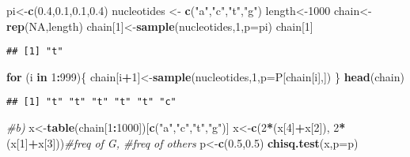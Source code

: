 \documentclass[
]{article}
\newenvironment{Shaded}{\begin{snugshade}}{\end{snugshade}}
\newcommand{\CommentTok}[1]{\textcolor[rgb]{0.56,0.35,0.01}{\textit{#1}}}
\newcommand{\ControlFlowTok}[1]{\textcolor[rgb]{0.13,0.29,0.53}{\textbf{#1}}}
\newcommand{\DataTypeTok}[1]{\textcolor[rgb]{0.13,0.29,0.53}{#1}}
\newcommand{\DecValTok}[1]{\textcolor[rgb]{0.00,0.00,0.81}{#1}}
\newcommand{\FloatTok}[1]{\textcolor[rgb]{0.00,0.00,0.81}{#1}}
\newcommand{\KeywordTok}[1]{\textcolor[rgb]{0.13,0.29,0.53}{\textbf{#1}}}
\newcommand{\NormalTok}[1]{#1}
\newcommand{\OperatorTok}[1]{\textcolor[rgb]{0.81,0.36,0.00}{\textbf{#1}}}
\newcommand{\OtherTok}[1]{\textcolor[rgb]{0.56,0.35,0.01}{#1}}
\newcommand{\StringTok}[1]{\textcolor[rgb]{0.31,0.60,0.02}{#1}}
\begin{document}
\begin{Shaded}
\begin{Highlighting}[]
\NormalTok{pi<-}\KeywordTok{c}\NormalTok{(}\FloatTok{0.4}\NormalTok{,}\FloatTok{0.1}\NormalTok{,}\FloatTok{0.1}\NormalTok{,}\FloatTok{0.4}\NormalTok{)}
\NormalTok{nucleotides <-}\StringTok{ }\KeywordTok{c}\NormalTok{(}\StringTok{"a"}\NormalTok{,}\StringTok{"c"}\NormalTok{,}\StringTok{"t"}\NormalTok{,}\StringTok{"g"}\NormalTok{)}
\NormalTok{length<-}\DecValTok{1000}
\NormalTok{chain<-}\KeywordTok{rep}\NormalTok{(}\OtherTok{NA}\NormalTok{,length)}
\NormalTok{chain[}\DecValTok{1}\NormalTok{]<-}\KeywordTok{sample}\NormalTok{(nucleotides,}\DecValTok{1}\NormalTok{,}\DataTypeTok{p=}\NormalTok{pi)}
\NormalTok{chain[}\DecValTok{1}\NormalTok{]}
\end{Highlighting}
\end{Shaded}

\begin{verbatim}
## [1] "t"
\end{verbatim}

\begin{Shaded}
\begin{Highlighting}[]
\ControlFlowTok{for}\NormalTok{ (i }\ControlFlowTok{in} \DecValTok{1}\OperatorTok{:}\DecValTok{999}\NormalTok{)\{}
\NormalTok{ chain[i}\OperatorTok{+}\DecValTok{1}\NormalTok{]<-}\KeywordTok{sample}\NormalTok{(nucleotides,}\DecValTok{1}\NormalTok{,}\DataTypeTok{p=}\NormalTok{P[chain[i],])}
\NormalTok{ \}}
\KeywordTok{head}\NormalTok{(chain)}
\end{Highlighting}
\end{Shaded}

\begin{verbatim}
## [1] "t" "t" "t" "t" "t" "c"
\end{verbatim}

\begin{Shaded}
\begin{Highlighting}[]
\CommentTok{#b)}
\NormalTok{x<-}\KeywordTok{table}\NormalTok{(chain[}\DecValTok{1}\OperatorTok{:}\DecValTok{1000}\NormalTok{])[}\KeywordTok{c}\NormalTok{(}\StringTok{"a"}\NormalTok{,}\StringTok{"c"}\NormalTok{,}\StringTok{"t"}\NormalTok{,}\StringTok{"g"}\NormalTok{)]}
\NormalTok{x<-}\KeywordTok{c}\NormalTok{(}\DecValTok{2}\OperatorTok{*}\NormalTok{(x[}\DecValTok{4}\NormalTok{]}\OperatorTok{+}\NormalTok{x[}\DecValTok{2}\NormalTok{]), }\DecValTok{2}\OperatorTok{*}\NormalTok{(x[}\DecValTok{1}\NormalTok{]}\OperatorTok{+}\NormalTok{x[}\DecValTok{3}\NormalTok{]))}\CommentTok{#freq of G, #freq of others}
\NormalTok{p<-}\KeywordTok{c}\NormalTok{(}\FloatTok{0.5}\NormalTok{,}\FloatTok{0.5}\NormalTok{)}
\KeywordTok{chisq.test}\NormalTok{(x,}\DataTypeTok{p=}\NormalTok{p)}
\end{Highlighting}
\end{Shaded}
\end{document}
